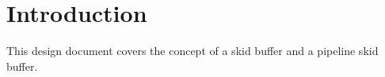 
\section{Introduction}

This design document covers the concept of a skid buffer and a pipeline skid buffer. 
\newpage
 \printbibliography

